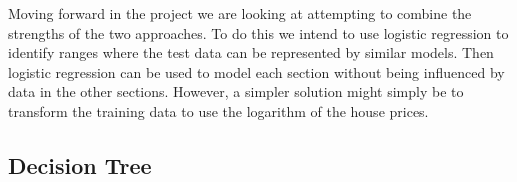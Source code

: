 \documentclass[10pt]{article}
\begin{document}
\begin{multicols}{2}
\begin{tabular}{r|c}
				\hline
			\end{tabular}
			\label{table:logr_performance}        
			\setlength{\parindent}{15pt}
		\par
 			Moving forward in the project we are looking at attempting to combine the strengths of the two approaches. To do this we intend to use logistic regression to identify ranges where the test data can be represented by similar models. Then logistic regression can be used to model each section without being influenced by data in the other sections. However, a simpler solution might simply be to transform the training data to use the logarithm of the house prices.
		\subsection{Decision Tree}

\end{multicols}
\end{document}

